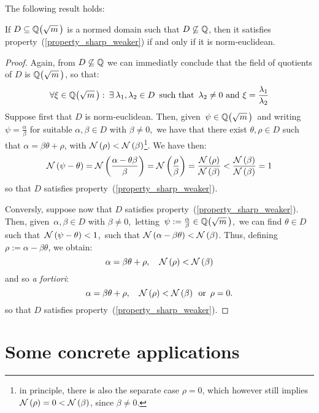 \smallskip
The following result holds:

\begin{thm}\label{sharp-weaker_equivalent_norm-euclidean}
If $D \subseteq \QQ{m}$ is a normed
domain such that $D \not\subseteq \mathbb{Q}$, then it satisfies
property~(\ref{property_sharp_weaker}) if and only if
it is norm-euclidean.
\end{thm}

\begin{proof}
%
Again, from $D \not\subseteq \mathbb{Q}$ we can immediatly conclude
that the field of quotients of $D$ is $\QQ{m}$, so that:
$$
\forall \xi \in \QQ{m}:\: \exists\: \lambda_1,
\lambda_2 \in D\ \,\textrm{such\ that}\, \ \lambda_2
\ne 0\ \textrm{and}\ \xi = \frac{\lambda_1}{\lambda_2}
$$
Suppose first that $D$ is norm-euclidean.
Then, given\, $\psi \in \QQ{m}$\, and writing
\,$\psi = \frac{\alpha}{\beta}$ for suitable $\alpha,\beta \in D$
with $\beta \ne 0$,\, we have that there exist $\theta,\rho
\in D$ such that $\alpha = \beta \theta + \rho$, with
$\mathcal{N}\left(\rho\right) < \mathcal{N}\left(\beta\right)$\footnote{%
in principle, there is also the separate case $\rho = 0$, which
however still implies $\mathcal{N}\left(\rho\right) = 0 < \mathcal{N}\left(\beta\right)$, since
$\beta \ne 0$.}.
We have then:
$$
\mathcal{N}\left(\psi - \theta\right) =
\mathcal{N}\left(\frac{\alpha - \theta\beta}{\beta}\right)
= \mathcal{N}\left(\frac{\rho}{\beta}\right)
= \frac{\mathcal{N}\left(\rho\right)}{\mathcal{N}\left(\beta\right)}
< \frac{\mathcal{N}\left(\beta\right)}{\mathcal{N}\left(\beta\right)} = 1
$$
so that $D$ satisfies property~(\ref{property_sharp_weaker}).

Conversly, suppose now that $D$ satisfies
property~(\ref{property_sharp_weaker}).
Then, given\, $\alpha,\beta \in D$ with $\beta \ne 0$,\,
letting\, $\psi:= \frac{\alpha}{\beta} \in \QQ{m}$,
\,we can find $\theta \in D$ such that\,
$\mathcal{N}\left(\psi - \theta\right) < 1$,\, \ie such that
$\mathcal{N}\left(\alpha - \beta\theta\right) < \mathcal{N}\left(\beta\right)$.
Thus, defining $\rho:= \alpha - \beta\theta$, we
obtain:
$$
\alpha = \beta\theta + \rho, \quad
\mathcal{N}\left(\rho\right) < \mathcal{N}\left(\beta\right)
$$
and so \emph{a fortiori}:
$$
\alpha = \beta\theta + \rho, \quad
\mathcal{N}\left(\rho\right) < \mathcal{N}\left(\beta\right)\ \,\textrm{or}\,\ \rho = 0.
$$
so that $D$ satisfies property~(\ref{property_sharp_weaker}).
%
\end{proof}

\section{Some concrete applications}\label{apps}

